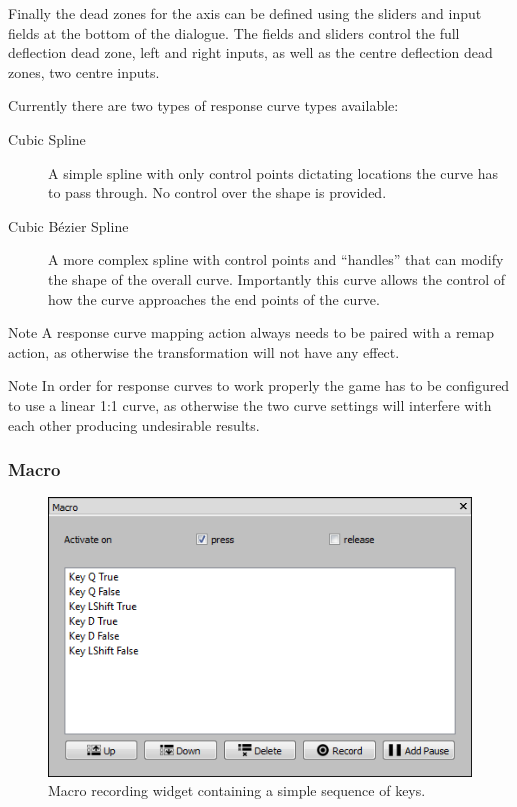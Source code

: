 \documentclass[a4, 10pt]{article}
\begin{document}
Finally the dead zones for the axis can be defined using the sliders and
input fields at the bottom of the dialogue. The fields and sliders
control the full deflection dead zone, left and right inputs, as well as
the centre deflection dead zones, two centre inputs.

Currently there are two types of response curve types available:
\begin{description}
    \item[Cubic Spline] A simple spline with only control points dictating
        locations the curve has to pass through. No control over the
        shape is provided.
    \item[Cubic B\'{e}zier Spline] A more complex spline with control
        points and ``handles'' that can modify the shape of the overall
        curve. Importantly this curve allows the control of how the
        curve approaches the end points of the curve.
\end{description}

\begin{bclogo}[
    couleur=yellow!40,
    couleurBord=orange!80,
    couleurBarre=orange!80,
    arrondi=0.1,
    logo=\bcinfo
]{Note}
    A response curve mapping action always needs to be paired with a
    remap action, as otherwise the transformation will not have any
    effect.
\end{bclogo}

\vspace{1em}

\begin{bclogo}[
    couleur=yellow!40,
    couleurBord=orange!80,
    couleurBarre=orange!80,
    arrondi=0.1,
    logo=\bcinfo
]{Note}
    In order for response curves to work properly the game has to be
    configured to use a linear 1:1 curve, as otherwise the two curve
    settings will interfere with each other producing undesirable
    results.
\end{bclogo}


\subsubsection{Macro}

\begin{figure}[bt]
    \centering

    \includegraphics[width=0.75\linewidth]{images/action_macro}
    \caption{Macro recording widget containing a simple sequence of
    keys.}
    \label{fig:action_macro}
\end{figure}
\end{document}
